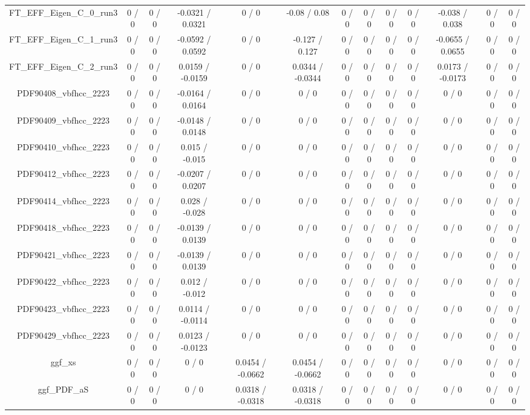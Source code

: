 \documentclass[10pt]{article}
\begin{document}
\begin{table}[htbp]
\begin{center}
\begin{tabular}{|c|c|c|c|c|c|c|c|c|c|c|c|c|}
  FT_EFF_Eigen_C_0_run3 & 0 / 0 & 0 / 0 & -0.0321 / 0.0321 & 0 / 0 & -0.08 / 0.08 & 0 / 0 & 0 / 0 & 0 / 0 & 0 / 0 & -0.038 / 0.038 & 0 / 0 & 0 / 0 \\ 
  FT_EFF_Eigen_C_1_run3 & 0 / 0 & 0 / 0 & -0.0592 / 0.0592 & 0 / 0 & -0.127 / 0.127 & 0 / 0 & 0 / 0 & 0 / 0 & 0 / 0 & -0.0655 / 0.0655 & 0 / 0 & 0 / 0 \\ 
  FT_EFF_Eigen_C_2_run3 & 0 / 0 & 0 / 0 & 0.0159 / -0.0159 & 0 / 0 & 0.0344 / -0.0344 & 0 / 0 & 0 / 0 & 0 / 0 & 0 / 0 & 0.0173 / -0.0173 & 0 / 0 & 0 / 0 \\ 
  PDF90408_vbfhcc_2223 & 0 / 0 & 0 / 0 & -0.0164 / 0.0164 & 0 / 0 & 0 / 0 & 0 / 0 & 0 / 0 & 0 / 0 & 0 / 0 & 0 / 0 & 0 / 0 & 0 / 0 \\ 
  PDF90409_vbfhcc_2223 & 0 / 0 & 0 / 0 & -0.0148 / 0.0148 & 0 / 0 & 0 / 0 & 0 / 0 & 0 / 0 & 0 / 0 & 0 / 0 & 0 / 0 & 0 / 0 & 0 / 0 \\ 
  PDF90410_vbfhcc_2223 & 0 / 0 & 0 / 0 & 0.015 / -0.015 & 0 / 0 & 0 / 0 & 0 / 0 & 0 / 0 & 0 / 0 & 0 / 0 & 0 / 0 & 0 / 0 & 0 / 0 \\ 
  PDF90412_vbfhcc_2223 & 0 / 0 & 0 / 0 & -0.0207 / 0.0207 & 0 / 0 & 0 / 0 & 0 / 0 & 0 / 0 & 0 / 0 & 0 / 0 & 0 / 0 & 0 / 0 & 0 / 0 \\ 
  PDF90414_vbfhcc_2223 & 0 / 0 & 0 / 0 & 0.028 / -0.028 & 0 / 0 & 0 / 0 & 0 / 0 & 0 / 0 & 0 / 0 & 0 / 0 & 0 / 0 & 0 / 0 & 0 / 0 \\ 
  PDF90418_vbfhcc_2223 & 0 / 0 & 0 / 0 & -0.0139 / 0.0139 & 0 / 0 & 0 / 0 & 0 / 0 & 0 / 0 & 0 / 0 & 0 / 0 & 0 / 0 & 0 / 0 & 0 / 0 \\ 
  PDF90421_vbfhcc_2223 & 0 / 0 & 0 / 0 & -0.0139 / 0.0139 & 0 / 0 & 0 / 0 & 0 / 0 & 0 / 0 & 0 / 0 & 0 / 0 & 0 / 0 & 0 / 0 & 0 / 0 \\ 
  PDF90422_vbfhcc_2223 & 0 / 0 & 0 / 0 & 0.012 / -0.012 & 0 / 0 & 0 / 0 & 0 / 0 & 0 / 0 & 0 / 0 & 0 / 0 & 0 / 0 & 0 / 0 & 0 / 0 \\ 
  PDF90423_vbfhcc_2223 & 0 / 0 & 0 / 0 & 0.0114 / -0.0114 & 0 / 0 & 0 / 0 & 0 / 0 & 0 / 0 & 0 / 0 & 0 / 0 & 0 / 0 & 0 / 0 & 0 / 0 \\ 
  PDF90429_vbfhcc_2223 & 0 / 0 & 0 / 0 & 0.0123 / -0.0123 & 0 / 0 & 0 / 0 & 0 / 0 & 0 / 0 & 0 / 0 & 0 / 0 & 0 / 0 & 0 / 0 & 0 / 0 \\ 
  ggf_xs & 0 / 0 & 0 / 0 & 0 / 0 & 0.0454 / -0.0662 & 0.0454 / -0.0662 & 0 / 0 & 0 / 0 & 0 / 0 & 0 / 0 & 0 / 0 & 0 / 0 & 0 / 0 \\ 
  ggf_PDF_aS & 0 / 0 & 0 / 0 & 0 / 0 & 0.0318 / -0.0318 & 0.0318 / -0.0318 & 0 / 0 & 0 / 0 & 0 / 0 & 0 / 0 & 0 / 0 & 0 / 0 & 0 / 0 \\ 

\end{tabular}
\end{center}
\end{table}
\end{document}
